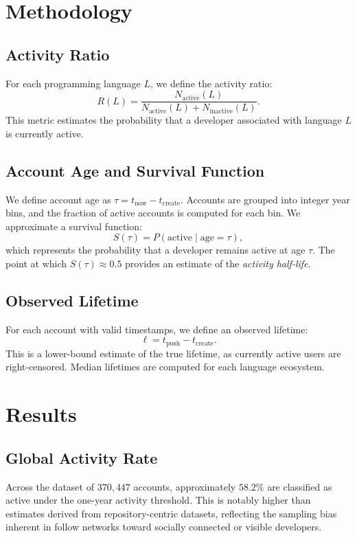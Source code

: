\documentclass[12pt,a4paper]{article}
\begin{document}
\section{Methodology}

\subsection{Activity Ratio}

For each programming language $L$, we define the activity ratio:
\[
R(L) = \frac{N_{\text{active}}(L)}{N_{\text{active}}(L) + N_{\text{inactive}}(L)}.
\]
This metric estimates the probability that a developer associated with language $L$ is currently active.

\subsection{Account Age and Survival Function}

We define account age as $\tau = t_{\text{now}} - t_{\text{create}}$. Accounts are grouped into integer year bins, and the fraction of active accounts is computed for each bin. We approximate a survival function:
\[
S(\tau) = P(\text{active} \mid \text{age} = \tau),
\]
which represents the probability that a developer remains active at age $\tau$. The point at which $S(\tau) \approx 0.5$ provides an estimate of the \emph{activity half-life}.

\subsection{Observed Lifetime}

For each account with valid timestamps, we define an observed lifetime:
\[
\ell = t_{\text{push}} - t_{\text{create}}.
\]
This is a lower-bound estimate of the true lifetime, as currently active users are right-censored. Median lifetimes are computed for each language ecosystem.

\section{Results}

\subsection{Global Activity Rate}

Across the dataset of $370{,}447$ accounts, approximately $58.2\%$ are classified as active under the one-year activity threshold. This is notably higher than estimates derived from repository-centric datasets, reflecting the sampling bias inherent in follow networks toward socially connected or visible developers.
\end{document}
